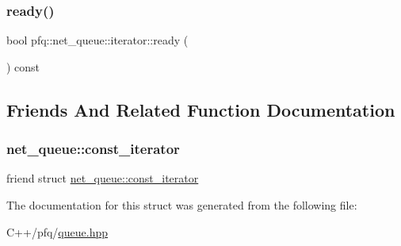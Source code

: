 \mbox{\label{structpfq_1_1net__queue_1_1iterator_aff387f94f0ab59c881c7c27c3f0e038d}} 
\subsubsection{\texorpdfstring{ready()}{ready()}}
{\footnotesize\ttfamily bool pfq\+::net\+\_\+queue\+::iterator\+::ready (\begin{DoxyParamCaption}{ }\end{DoxyParamCaption}) const\hspace{0.3cm}{\ttfamily [inline]}}



\subsection{Friends And Related Function Documentation}
\mbox{\label{structpfq_1_1net__queue_1_1iterator_a0fa1c59b5fb1d453f45032bc7a6ea3b0}} 
\subsubsection{\texorpdfstring{net\+\_\+queue\+::const\+\_\+iterator}{net\_queue::const\_iterator}}
{\footnotesize\ttfamily friend struct \hyperlink{structpfq_1_1net__queue_1_1const__iterator}{net\+\_\+queue\+::const\+\_\+iterator}\hspace{0.3cm}{\ttfamily [friend]}}



The documentation for this struct was generated from the following file\+:\begin{DoxyCompactItemize}
\item 
C++/pfq/\hyperlink{queue_8hpp}{queue.\+hpp}\end{DoxyCompactItemize}

